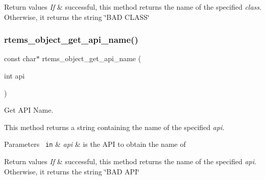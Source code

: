 \begin{DoxyRetVals}{Return values}
{\em If} & successful, this method returns the name of the specified {\itshape class}. Otherwise, it returns the string \char`\"{}\+B\+A\+D C\+L\+A\+S\+S\char`\"{} \\
\hline
\end{DoxyRetVals}
\mbox{\label{group__ClassicClassInfo_gaa3fcf442c9bec4b06ea11721d1001c3d}} 
\subsubsection{\texorpdfstring{rtems\_object\_get\_api\_name()}{rtems\_object\_get\_api\_name()}}
{\footnotesize\ttfamily const char$\ast$ rtems\+\_\+object\+\_\+get\+\_\+api\+\_\+name (\begin{DoxyParamCaption}\item[{int}]{api }\end{DoxyParamCaption})}



Get A\+PI Name. 

This method returns a string containing the name of the specified {\itshape api}.


\begin{DoxyParams}[1]{Parameters}
\mbox{\texttt{ in}}  & {\em api} & is the A\+PI to obtain the name of\\
\hline
\end{DoxyParams}

\begin{DoxyRetVals}{Return values}
{\em If} & successful, this method returns the name of the specified {\itshape api}. Otherwise, it returns the string \char`\"{}\+B\+A\+D A\+P\+I\char`\"{} \\
\hline
\end{DoxyRetVals}
\mbox{\label{group__ClassicClassInfo_gae8ffdf2a3cfe0e716ebfd4a3eb1bfece}} 
